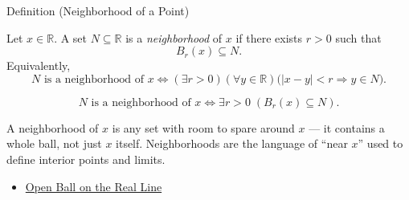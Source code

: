 \begin{definitionbox}{Definition (Neighborhood of a Point)}
\begin{definition}
\label{def:neighborhood-of-point}
Let $x\in\mathbb{R}$.  A set $N\subseteq\mathbb{R}$ is a
\emph{neighborhood} of $x$ if there exists $r>0$ such that
\[
  B_r(x)\subseteq N.
\]
Equivalently,
\[
  N\text{ is a neighborhood of }x
  \Longleftrightarrow
  (\exists r>0)(\forall y\in\mathbb{R})
  \bigl(|x-y|<r\Longrightarrow y\in N\bigr).
\]
\end{definition}
\end{definitionbox}
\begin{remark*}
\[
N \text{ is a neighborhood of } x \Longleftrightarrow \exists r>0\;(B_{r}(x)\subseteq N).
\]
\end{remark*}
\begin{remark*}[Interpretation]
A neighborhood of $x$ is any set with room to spare around $x$ --- it contains a whole ball, not just $x$ itself. Neighborhoods are the language of ``near $x$'' used to define interior points and limits.
\end{remark*}
\begin{dependencies}
\begin{itemize}
  \item \hyperref[def:open-ball]{Open Ball on the Real Line}
\end{itemize}
\end{dependencies}
